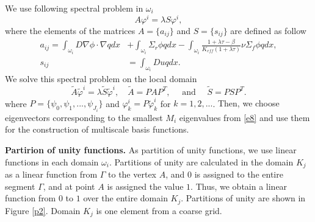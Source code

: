 \documentclass[runningheads]{llncs}
\begin{document}
We use following spectral problem in $\omega_i$
\begin{equation} \label{e4}
A \varphi^i = \lambda S \varphi^i,
\end{equation} 
where the elements of the matrices $A= \{ a_{ij} \}$ and $S = \{ s_{ij} \}$ are defined as follow{
\begin{equation} \label{e5}
\begin{split}
a_{ij} = 
\int_{\omega_i} D \nabla\phi \cdot \nabla q dx &+ 
\int_{\omega_i} \Sigma_r \phi q dx - 
\int_{\omega_i} \frac{1+\lambda\tau-\beta}{K_{eff}(1+\lambda\tau)} \nu \Sigma_f \phi q dx, \\
s_{ij} &= \int_{\omega _i} D u q dx.
\end{split}
\end{equation}}
We solve this spectral problem on the local domain
\begin{equation} \label{e8}
\tilde{A} \tilde{\varphi}^i = \lambda \tilde{S}  \tilde{\varphi}^i, \quad
\tilde{A} = P A P^T, \quad \text{ and } \quad 
\tilde{S} = P S P^T.
\end{equation}
where $P = \{ \psi_0, \psi_1, ...,\psi_{J_i} \}$ and {$\varphi^i_k = P \tilde{\varphi}^i_k$} for $k = 1,2,...$.
{Then, we choose eigenvectors corresponding to the smallest $M_{i}$ eigenvalues from \eqref{e8} and use them for the construction of multiscale basis functions.} 

\textbf{Partirion of unity functions. } As  partition of unity functions, we use linear functions in each domain $\omega_i$.
Partitions of unity are calculated in the domain $ K_j $ as a linear function from $\Gamma$ to the vertex $ A $, and $ 0 $ is assigned to the entire segment $\Gamma$, and at point $ A $ is assigned the value $1$. 
Thus, we obtain a linear function from $ 0 $ to $ 1 $ over the entire domain $ K_j $. 
Partitions of unity are shown in Figure \ref{p2}. 
Domain $K_j$  is one element from a coarse grid. 
\end{document}
